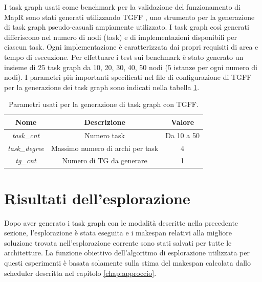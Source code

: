 I task graph usati come benchmark per la validazione del funzionamento di
\mbox{MapR} sono stati generati utilizzando \ac{TGFF} \cite{tgff}, uno strumento per
la generazione di task graph pseudo-casuali ampiamente utilizzato.
I task graph cos\`i generati differiscono nel numero di nodi (task) e di implementazioni
disponibili per ciascun task. Ogni implementazione \`e caratterizzata dai propri requisiti
di area e tempo di esecuzione. Per effettuare i test sui benchmark \`e stato generato un insieme di 25 task graph da
10, 20, 30, 40, 50 nodi (5 istanze per ogni numero di nodi). I parametri pi\`u importanti specificati
nel file di configurazione di \ac{TGFF} per la generazione dei task graph sono indicati nella tabella
\ref{tab:parametriTGFF}.

\begin{table}[t]
  \begin{center}
  \begin{tabular}{|c|c|c|}
    \hline
    Nome & Descrizione & Valore\\
    \hline
    \emph{task\_cnt} & Numero task & Da 10 a 50\\
    \hline
    \emph{task\_degree} & Massimo numero di archi per task & 4\\
    \hline
    \emph{tg\_cnt} & Numero di TG da generare & 1\\
    \hline
  \end{tabular}
  \caption{Parametri usati per la generazione di task graph con \acs{TGFF}.}
  \label{tab:parametriTGFF}
\end{center}
\end{table}




\section{Risultati dell'esplorazione}
\label{sec:risultatiEsplorazione}
Dopo aver generato i task graph con le modalit\`a descritte nella precedente
sezione, l'esplorazione \`e stata eseguita e i makespan relativi alla migliore soluzione
trovata nell'esplorazione corrente sono stati salvati per tutte le architetture.
La funzione obiettivo dell'algoritmo di esplorazione utilizzata per questi esperimenti
\`e basata solamente sulla stima del makespan calcolata dallo scheduler descritta nel
capitolo \ref{chap:approccio}.


